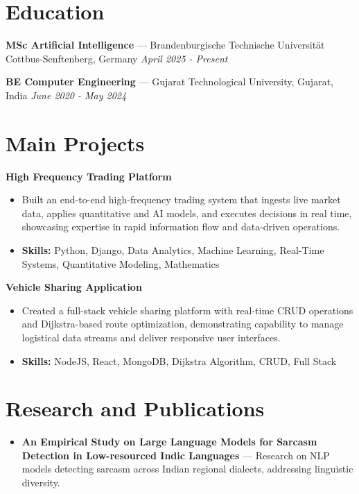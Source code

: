 \documentclass[a4paper,10pt]{article}
\begin{document}
\section*{Education}
\textbf{MSc Artificial Intelligence} — Brandenburgische Technische Universität Cottbus-Senftenberg, Germany \hfill \textit{April 2025 - Present}\par
\vspace{1.5pt}
\textbf{BE Computer Engineering} — Gujarat Technological University, Gujarat, India \hfill \textit{June 2020 - May 2024}\par

\section*{Main Projects}
\textbf{High Frequency Trading Platform}\par
\vspace{1pt}
\begin{itemize}
  \item Built an end-to-end high-frequency trading system that ingests live market data, applies quantitative and AI models, and executes decisions in real time, showcasing expertise in rapid information flow and data-driven operations.
  \item \textbf{Skills:} Python, Django, Data Analytics, Machine Learning, Real-Time Systems, Quantitative Modeling, Mathematics
\end{itemize}
\vspace{3pt}
\textbf{Vehicle Sharing Application}\par
\vspace{1pt}
\begin{itemize}
  \item Created a full-stack vehicle sharing platform with real-time CRUD operations and Dijkstra-based route optimization, demonstrating capability to manage logistical data streams and deliver responsive user interfaces.
  \item \textbf{Skills:} NodeJS, React, MongoDB, Dijkstra Algorithm, CRUD, Full Stack
\end{itemize}

\section*{Research and Publications}
\begin{itemize}
\item \textbf{An Empirical Study on Large Language Models for Sarcasm Detection in Low-resourced Indic Languages} — Research on NLP models detecting sarcasm across Indian regional dialects, addressing linguistic diversity.
\end{itemize}
\end{document}
